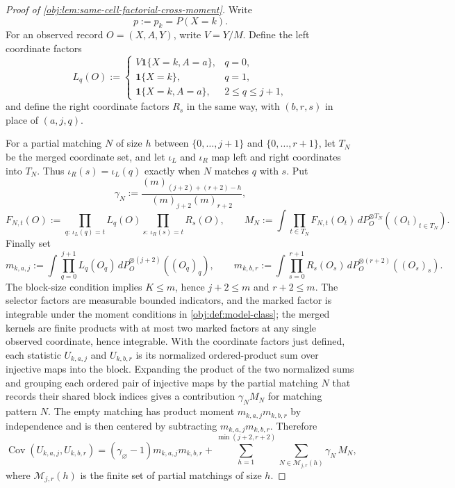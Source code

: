\begin{proof}[Proof of \cref{obj:lem:same-cell-factorial-cross-moment}]
Write
\[
p:=p_k=P(X=k).
\]
For an observed record \(O=(X,A,Y)\), write \(V=Y/M\).  Define the left coordinate factors
\[
L_q(O):=
\begin{cases}
V\mathbf 1\{X=k,A=a\}, & q=0,\\
\mathbf 1\{X=k\}, & q=1,\\
\mathbf 1\{X=k,A=a\}, & 2\le q\le j+1,
\end{cases}
\]
and define the right coordinate factors \(R_s\) in the same way, with \((b,r,s)\) in place of \((a,j,q)\).

For a partial matching \(N\) of size \(h\) between \(\{0,\ldots,j+1\}\) and \(\{0,\ldots,r+1\}\), let \(T_N\) be the merged coordinate set, and let \(\iota_L\) and \(\iota_R\) map left and right coordinates into \(T_N\). Thus \(\iota_R(s)=\iota_L(q)\) exactly when \(N\) matches \(q\) with \(s\). Put
\[
\gamma_N:=
\frac{(m)_{(j+2)+(r+2)-h}}{(m)_{j+2}(m)_{r+2}},
\]
\[
F_{N,t}(O):=
\prod_{q:\,\iota_L(q)=t}L_q(O)
\prod_{s:\,\iota_R(s)=t}R_s(O),
\qquad
M_N:=\int \prod_{t\in T_N}F_{N,t}(O_t)\,
  dP_O^{\otimes T_N}((O_t)_{t\in T_N}).
\]
Finally set
\[
m_{k,a,j}:=\int\prod_{q=0}^{j+1}L_q(O_q)\,
  dP_O^{\otimes(j+2)}((O_q)_q),
\qquad
m_{k,b,r}:=\int\prod_{s=0}^{r+1}R_s(O_s)\,
  dP_O^{\otimes(r+2)}((O_s)_s).
\]
The block-size condition implies \(K\le m\), hence \(j+2\le m\) and \(r+2\le m\). The selector factors are measurable bounded indicators, and the marked factor is integrable under the moment conditions in \cref{obj:def:model-class}; the merged kernels are finite products with at most two marked factors at any single observed coordinate, hence integrable. With the coordinate factors just defined, each statistic \(U_{k,a,j}\) and \(U_{k,b,r}\) is its normalized ordered-product sum over injective maps into the block. Expanding the product of the two normalized sums and grouping each ordered pair of injective maps by the partial matching \(N\) that records their shared block indices gives a contribution \(\gamma_N M_N\) for matching pattern \(N\). The empty matching has product moment \(m_{k,a,j}m_{k,b,r}\) by independence and is then centered by subtracting \(m_{k,a,j}m_{k,b,r}\). Therefore
\[
\operatorname{Cov}(U_{k,a,j},U_{k,b,r})
=
(\gamma_\varnothing-1)m_{k,a,j}m_{k,b,r}
+
\sum_{h=1}^{\min(j+2,r+2)}
\sum_{N\in\mathcal M_{j,r}(h)}
\gamma_N\,M_N,
\]
where \(\mathcal M_{j,r}(h)\) is the finite set of partial matchings of size \(h\).


\end{proof}
